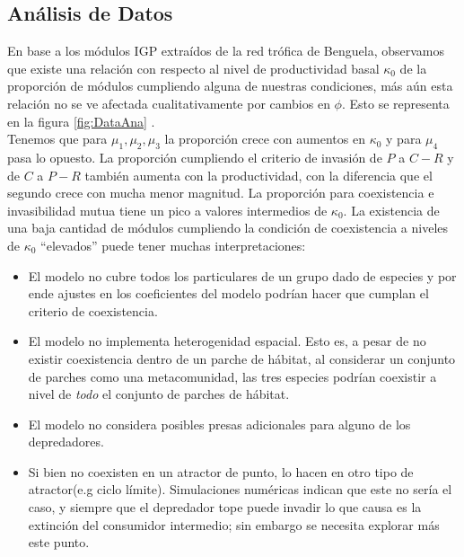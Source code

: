 \subsection{An\'alisis de Datos}
En base a los m\'odulos IGP extra\'idos de la red tr\'ofica de Benguela, observamos que existe una relaci\'on con respecto al nivel de productividad basal $\kappa_0$ de la proporci\'on de m\'odulos cumpliendo alguna de nuestras condiciones, m\'as a\'un esta relaci\'on no se ve afectada cualitativamente por cambios en $\phi$. Esto se representa en la figura \ref{fig:DataAna} . \\
Tenemos que para $\mu_1, \mu_2 , \mu_3$  la proporci\'on crece con aumentos en $\kappa_0$ y para $\mu_4$ pasa lo opuesto. La proporci\'on cumpliendo el criterio de invasi\'on de $P$ a $C-R$ y de $C$ a $P-R$ tambi\'en aumenta con la productividad, con la diferencia que el segundo crece con mucha menor magnitud. La proporci\'on para coexistencia e invasibilidad mutua tiene un pico a valores intermedios de $\kappa_0$. La existencia de una baja cantidad de m\'odulos cumpliendo la condici\'on de coexistencia a niveles de $\kappa_0$ ``elevados'' puede tener muchas interpretaciones:
\begin{itemize}
\item  El modelo no cubre todos los particulares de un grupo dado de especies y por ende ajustes en los coeficientes del modelo podr\'ian hacer que cumplan el criterio de coexistencia.
\item El modelo no implementa heterogenidad espacial. Esto es, a pesar de no existir coexistencia dentro de un parche de h\'abitat, al considerar un conjunto de parches como una metacomunidad, las tres especies podr\'ian coexistir a nivel de \emph{todo} el conjunto de parches de h\'abitat.
\item El modelo no considera posibles presas adicionales para alguno de los depredadores\citep{holt2007alternative}.
\item Si bien no coexisten en un atractor de punto, lo hacen en otro tipo de atractor(e.g ciclo l\'imite). Simulaciones num\'ericas indican que este no ser\'ia el caso, y siempre que el depredador tope puede invadir lo que causa es la extinci\'on del consumidor intermedio; sin embargo se necesita explorar m\'as este punto. 
\end{itemize}

